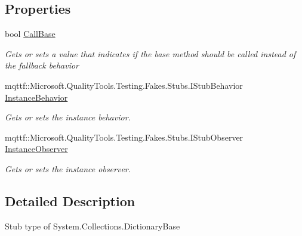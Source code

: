 \subsection*{Properties}
\begin{DoxyCompactItemize}
\item 
bool \hyperlink{class_system_1_1_collections_1_1_fakes_1_1_stub_dictionary_base_ac8b7bd11aa5e8d6a69015294feea2442}{Call\-Base}
\begin{DoxyCompactList}\small\item\em Gets or sets a value that indicates if the base method should be called instead of the fallback behavior\end{DoxyCompactList}\item 
mqttf\-::\-Microsoft.\-Quality\-Tools.\-Testing.\-Fakes.\-Stubs.\-I\-Stub\-Behavior \hyperlink{class_system_1_1_collections_1_1_fakes_1_1_stub_dictionary_base_ad539cfa3759611a2c353268641095fb9}{Instance\-Behavior}
\begin{DoxyCompactList}\small\item\em Gets or sets the instance behavior.\end{DoxyCompactList}\item 
mqttf\-::\-Microsoft.\-Quality\-Tools.\-Testing.\-Fakes.\-Stubs.\-I\-Stub\-Observer \hyperlink{class_system_1_1_collections_1_1_fakes_1_1_stub_dictionary_base_a46ee534b1bd0d8ae218bac1dec48f6b6}{Instance\-Observer}
\begin{DoxyCompactList}\small\item\em Gets or sets the instance observer.\end{DoxyCompactList}\end{DoxyCompactItemize}


\subsection{Detailed Description}
Stub type of System.\-Collections.\-Dictionary\-Base



